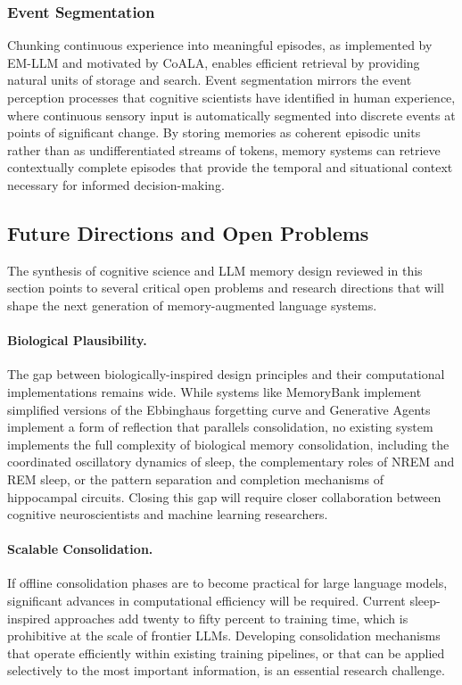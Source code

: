\documentclass[11pt,letterpaper]{article}
\begin{document}
\subsubsection{Event Segmentation}

Chunking continuous experience into meaningful episodes, as implemented by EM-LLM and motivated by CoALA, enables efficient retrieval by providing natural units of storage and search. Event segmentation mirrors the event perception processes that cognitive scientists have identified in human experience, where continuous sensory input is automatically segmented into discrete events at points of significant change. By storing memories as coherent episodic units rather than as undifferentiated streams of tokens, memory systems can retrieve contextually complete episodes that provide the temporal and situational context necessary for informed decision-making.

\subsection{Future Directions and Open Problems}

The synthesis of cognitive science and LLM memory design reviewed in this section points to several critical open problems and research directions that will shape the next generation of memory-augmented language systems.

\paragraph{Biological Plausibility.} The gap between biologically-inspired design principles and their computational implementations remains wide. While systems like MemoryBank implement simplified versions of the Ebbinghaus forgetting curve and Generative Agents implement a form of reflection that parallels consolidation, no existing system implements the full complexity of biological memory consolidation, including the coordinated oscillatory dynamics of sleep, the complementary roles of NREM and REM sleep, or the pattern separation and completion mechanisms of hippocampal circuits. Closing this gap will require closer collaboration between cognitive neuroscientists and machine learning researchers.

\paragraph{Scalable Consolidation.} If offline consolidation phases are to become practical for large language models, significant advances in computational efficiency will be required. Current sleep-inspired approaches add twenty to fifty percent to training time, which is prohibitive at the scale of frontier LLMs. Developing consolidation mechanisms that operate efficiently within existing training pipelines, or that can be applied selectively to the most important information, is an essential research challenge.
\end{document}
